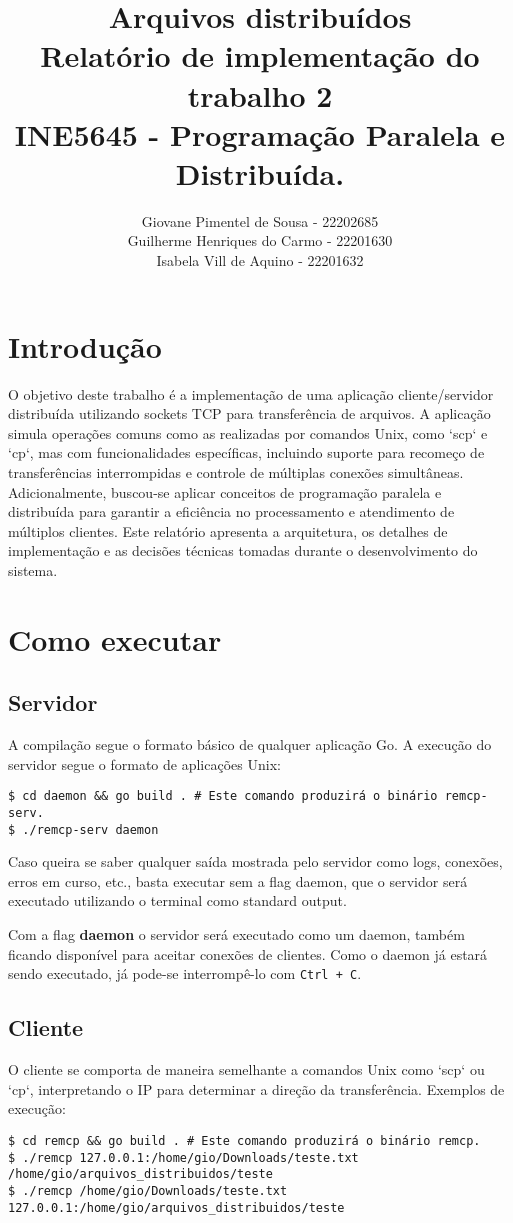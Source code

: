 \documentclass{article}
\title{
	Arquivos distribuídos\\
	\large Relatório de implementação do trabalho 2\\INE5645 - Programação Paralela e Distribuída.
}
\author{Giovane Pimentel de Sousa - 22202685\\
		Guilherme Henriques do Carmo - 22201630\\
		Isabela Vill de Aquino - 22201632
}
\begin{document}
\maketitle

\section*{Introdução}

O objetivo deste trabalho é a implementação de uma aplicação cliente/servidor distribuída utilizando sockets TCP para transferência de arquivos. A aplicação
simula operações comuns como as realizadas por comandos Unix, como `scp` e `cp`, mas com funcionalidades específicas, incluindo suporte para recomeço de
transferências interrompidas e controle de múltiplas conexões simultâneas. Adicionalmente, buscou-se aplicar conceitos de programação paralela e distribuída
para garantir a eficiência no processamento e atendimento de múltiplos clientes. Este relatório apresenta a arquitetura, os detalhes de implementação e as
decisões técnicas tomadas durante o desenvolvimento do sistema.

\section*{Como executar}

\subsection*{Servidor}
A compilação segue o formato básico de qualquer aplicação Go. A execução do servidor segue o formato de aplicações Unix:
\begin{lstlisting}
$ cd daemon && go build . # Este comando produzirá o binário remcp-serv.
$ ./remcp-serv daemon
\end{lstlisting}

Caso queira se saber qualquer saída mostrada pelo servidor como logs, conexões, erros em curso, etc., basta executar sem a flag daemon,
que o servidor será executado utilizando o terminal como standard output.

Com a flag \textbf{daemon} o servidor será executado como um daemon, também ficando disponível para aceitar conexões de clientes.
Como o daemon já estará sendo executado, já pode-se interrompê-lo com \lstinline{Ctrl + C}.

\subsection*{Cliente}
O cliente se comporta de maneira semelhante a comandos Unix como `scp` ou `cp`, interpretando o IP para determinar a direção da transferência. Exemplos de execução:
\begin{lstlisting}
$ cd remcp && go build . # Este comando produzirá o binário remcp.
$ ./remcp 127.0.0.1:/home/gio/Downloads/teste.txt /home/gio/arquivos_distribuidos/teste
$ ./remcp /home/gio/Downloads/teste.txt 127.0.0.1:/home/gio/arquivos_distribuidos/teste
\end{lstlisting}
\end{document}
